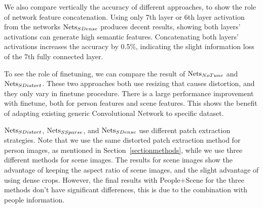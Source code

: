 \documentclass[10pt,twocolumn,letterpaper]{article}
\begin{document}
We also compare vertically the accuracy of different approaches, to show the role of  network feature concatenation. Using only 7th layer or 6th layer activation from the networks $\textup{Nets}_{SDense}$ produces decent results, showing both layers' activations can generate high semantic features. Concatenating both layers' activations increases the accuracy by 0.5\%, indicating the slight information loss of the 7th fully connected layer. 

To see the role of finetuning, we can compare the result of $\textup{Nets}_{NoTune}$  and $\textup{Nets}_{SDistort}$. These two approaches both use resizing that causes distortion, and they only vary in finetune procedure. There is a large performance improvement with finetune, both for person features and scene features. This shows the benefit of adapting existing generic Convolutional Network to specific dataset. 


$\textup{Nets}_{SDistort}$, $\textup{Nets}_{SSparse}$, and $\textup{Nets}_{SDense}$ use different patch extraction strategies. Note that we use the same distorted patch extraction method for person images, as mentioned in Section~\ref{sectionmethods}, while we use three different methods for scene images. The results for scene images show the advantage of keeping the aspect ratio of scene images, and the slight advantage of using dense crops. However, the final results with People+Scene for the three methods don't have significant differences, this is due to the combination with people information. 

\end{document}
